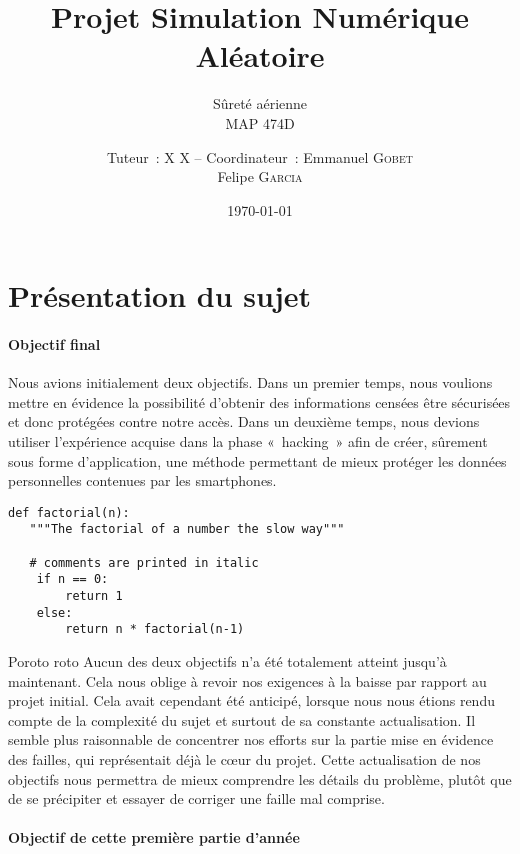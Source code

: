 \documentclass[a4paper, 12pt,twoside]{article}
\title{Projet Simulation Numérique Aléatoire}
\subtitle{Sûreté aérienne \\ MAP 474D}
\author{Tuteur~: X \textsc{X} -- Coordinateur~: Emmanuel \textsc{Gobet} \\
        Felipe \textsc{Garcia} \\}
\date\today
\newcommand{\code}[2]{
  \hrulefill
  \subsection*{#1}
  
  \vspace{2em}
}
\begin{document}
    \maketitle
    \renewcommand{\baselinestretch}{1.1}
    \setlength{\parskip}{0.5em}
    \tableofcontents
    \clearpage

    \section{Présentation du sujet}

        \paragraph{Objectif final} Nous avions initialement deux objectifs. Dans un premier temps, nous voulions mettre en évidence la possibilité d'obtenir des informations censées être sécurisées et donc protégées contre notre accès. Dans un deuxième temps, nous devions utiliser l'expérience acquise dans la phase «~hacking~» afin de créer, sûrement sous forme d'application, une méthode permettant de mieux protéger les données personnelles contenues par les smartphones.
        
\begin{lstlisting}
def factorial(n):
   """The factorial of a number the slow way"""

   # comments are printed in italic
    if n == 0:
        return 1
    else:
        return n * factorial(n-1)
\end{lstlisting}

       Poroto roto Aucun des deux objectifs n'a été totalement atteint jusqu'à maintenant. Cela nous oblige à revoir nos exigences à la baisse par rapport au projet initial. Cela avait cependant été anticipé, lorsque nous nous étions rendu compte de la complexité du sujet et surtout de sa constante actualisation. Il semble plus raisonnable de concentrer nos efforts sur la partie mise en évidence des failles, qui représentait déjà le c\oe{}ur du projet.
        Cette actualisation de nos objectifs nous permettra de mieux comprendre les détails du problème, plutôt que de se précipiter et essayer de corriger une faille mal comprise.

        \paragraph{Objectif de cette première partie d'année}
\end{document}
